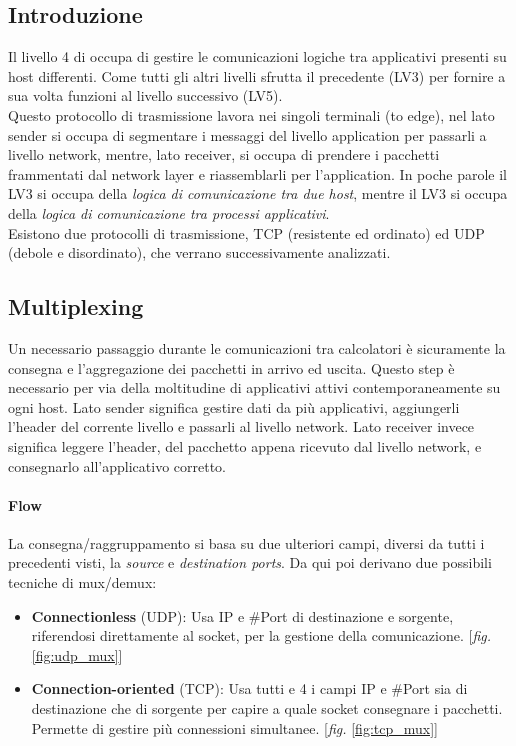 \documentclass[12pt]{article}
\begin{document}
\subsection{Introduzione} %
Il livello 4 di occupa di gestire le comunicazioni logiche tra applicativi presenti su host differenti. Come tutti gli altri livelli sfrutta il precedente (LV3) per fornire a sua volta funzioni al livello successivo (LV5).\\
Questo protocollo di trasmissione lavora nei singoli terminali (to edge), nel lato sender si occupa di segmentare i messaggi del livello application per passarli a livello network, mentre, lato receiver, si occupa di prendere i pacchetti frammentati dal network layer e riassemblarli per l'application. In poche parole il LV3 si occupa della \textit{logica di comunicazione tra due host}, mentre il LV3 si occupa della \textit{logica di comunicazione tra processi applicativi}.\\
Esistono due protocolli di trasmissione, TCP (resistente ed ordinato) ed UDP (debole e disordinato), che verrano successivamente analizzati.

\subsection{Multiplexing} %
Un necessario passaggio durante le comunicazioni tra calcolatori è sicuramente la consegna e l'aggregazione dei pacchetti in arrivo ed uscita. Questo step è necessario per via della moltitudine di applicativi attivi contemporaneamente su ogni host. Lato sender significa gestire dati da più applicativi, aggiungerli l'header del corrente livello e passarli al livello network. Lato receiver invece significa leggere l'header, del pacchetto appena ricevuto dal livello network, e consegnarlo all'applicativo corretto.

\paragraph{Flow} La consegna/raggruppamento si basa su due ulteriori campi, diversi da tutti i precedenti visti, la \textit{source} e \textit{destination ports}. Da qui poi derivano due possibili tecniche di mux/demux:
\begin{itemize}
  \item \textbf{Connectionless} (UDP): Usa IP e \#Port di destinazione e sorgente, riferendosi direttamente al socket, per la gestione della comunicazione. [\textit{fig. }\ref{fig:udp_mux}]
  \item \textbf{Connection-oriented} (TCP): Usa tutti e 4 i campi IP e \#Port sia di destinazione che di sorgente per capire a quale socket consegnare i pacchetti. Permette di gestire più connessioni simultanee. [\textit{fig. }\ref{fig:tcp_mux}]
\end{itemize}
\end{document}
